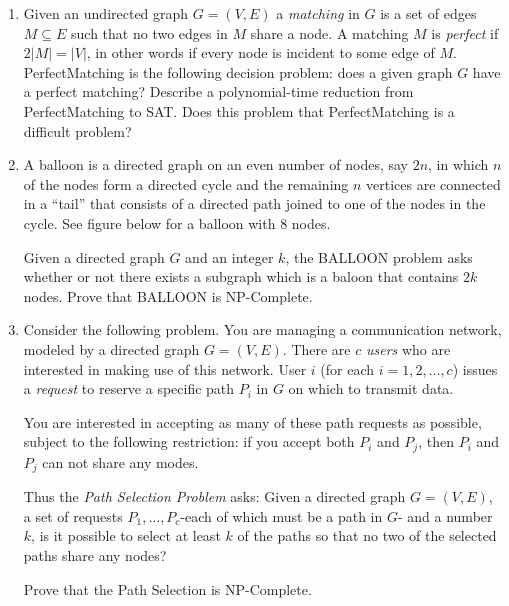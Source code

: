 \documentclass[11pt]{article}
\begin{document}
\vspace{1cm}

\begin{enumerate}


\item Given an undirected graph $G=(V,E)$ a {\em matching} in $G$ is
  a set of edges $M \subseteq E$ such that no two edges in $M$ share
  a node. A matching $M$ is {\em perfect} if $2|M| = |V|$, in other words
  if every node is incident to some edge of $M$. PerfectMatching is
  the following decision problem: does a given graph $G$ have a perfect
  matching? Describe a polynomial-time reduction from PerfectMatching to
  SAT. Does this problem that PerfectMatching is a difficult problem?


\item A balloon is a directed graph on an even number of nodes, say
  $2n$, in which $n$ of the nodes form a directed cycle and the
  remaining $n$ vertices are connected in a ``tail'' that consists of
  a directed path joined to one of the nodes in the cycle. See figure
  below for a balloon with $8$ nodes.
  
  Given a directed graph $G$ and an integer $k$, the BALLOON
  problem asks whether or not there exists a subgraph which is a baloon
  that contains $2k$ nodes. Prove that BALLOON is NP-Complete. 
  
\item Consider the following problem. You are managing a communication
  network, modeled by a directed graph $G=(V,E)$. There are $c$ {\em
    users} who are interested in making use of this network. User $i$
  (for each $i=1,2,\dots ,c$) issues a {\em request} to reserve a
  specific path $P_i$ in $G$ on which to transmit data.

  You are interested in accepting as many of these path requests as
  possible, subject to the following restriction: if you accept both
  $P_i$ and $P_j$, then $P_i$ and $P_j$ can not share any modes.

  Thus the {\em Path Selection Problem} asks: Given a directed graph
  $G=(V,E)$, a set of requests $P_1,\dots,P_c$-each of which must be a
  path in $G$- and a number $k$, is it possible to select at least $k$
  of the paths so that no two of the selected paths share any nodes?

  Prove that the Path Selection is NP-Complete.

\end{enumerate}
\end{document}
